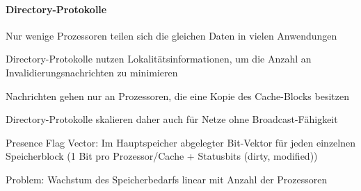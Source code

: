 \documentclass[a4paper]{article}
\begin{document}
\begin{multicols}{3}
  \paragraph{Directory-Protokolle}
  \begin{itemize*}
    \item Nur wenige Prozessoren teilen sich die gleichen Daten in vielen Anwendungen
    \item Directory-Protokolle nutzen Lokalitätsinformationen, um die Anzahl an Invalidierungsnachrichten zu minimieren
    \item Nachrichten gehen nur an Prozessoren, die eine Kopie des Cache-Blocks besitzen
    \item Directory-Protokolle skalieren daher auch für Netze ohne Broadcast-Fähigkeit
    \item Presence Flag Vector: Im Hauptspeicher abgelegter Bit-Vektor für jeden einzelnen Speicherblock (1 Bit pro Prozessor/Cache + Statusbits (dirty, modified))
    \item Problem: Wachstum des Speicherbedarfs linear mit Anzahl der Prozessoren
  \end{itemize*}
  
\end{multicols}
\end{document}
